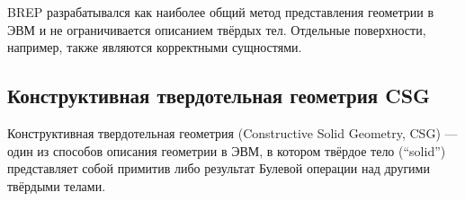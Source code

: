 BREP разрабатывался как наиболее общий метод представления геометрии в ЭВМ и не ограничивается описанием твёрдых тел. Отдельные поверхности, например, также являются корректными сущностями.



\subsection{Конструктивная твердотельная геометрия CSG}\label{sec:secGeoCSG}

Конструктивная твердотельная геометрия (Constructive Solid Geometry, CSG) --- один из способов описания геометрии в ЭВМ, в котором твёрдое тело (``solid'') представляет собой примитив либо результат Булевой операции над другими твёрдыми телами.


